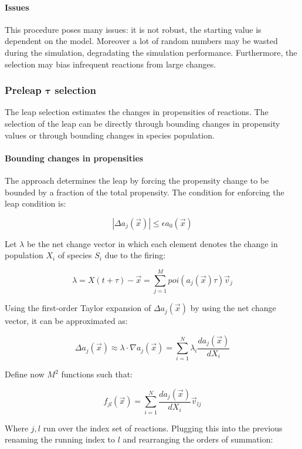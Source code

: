       \paragraph{Issues}
      This procedure poses many issues: it is not robust, the starting value is dependent on the model.
      Moreover a lot of random numbers may be wasted during the simulation, degradating the simulation performance.
      Furthermore, the selection may bias infrequent reactions from large changes.

    \subsubsection{Preleap $\mathbf{\tau}$ selection}
    The leap selection estimates the changes in propensities of reactions.
    The selection of the leap can be directly through bounding changes in propensity values or through bounding changes in species population.

      \paragraph{Bounding changes in propensities}
      The approach determines the leap by forcing the propensity change to be bounded by a fraction of the total propensity.
      The condition for enforcing the leap condition is:

      $$|\Delta a_j(\vec{x})|\le\epsilon a_0(\vec{x})$$

      Let $\lambda$ be the net change vector in which each element denotes the change in population $X_i$ of species $S_i$ due to the firing:

      $$\lambda = X(t+\tau)-\vec{x} = \sum\limits_{j=1}^Mpoi(a_j(\vec{x})\tau)\vec{v}_j$$

      Using the first-order Taylor expansion of $\Delta a_j(\vec{x})$ by using the net change vector, it can be approximated as:

      $$\Delta a_j(\vec{x})\approx\lambda\cdot\nabla a_j(\vec{x}) = \sum\limits_{i=1}^N\lambda_i\frac{d a_j(\vec{x})}{d X_i}$$

      Define now $M^2$ functions such that:

      $$f_{jl}(\vec{x}) = \sum\limits_{i=1}^N\frac{da_j(\vec{x})}{dX_i}\vec{v}_{lj}$$

      Where $j,l$ run over the index set of reactions.
      Plugging this into the previous renaming the running index to $l$ and rearranging the orders of summation:

